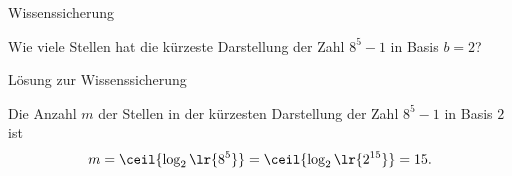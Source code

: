 \begin{frame}{Wissenssicherung}
	\begin{myexercise}\label{myexercise:003}
		Wie viele Stellen hat die kürzeste Darstellung der Zahl $8^5 - 1$ in Basis $b = 2$?
	\end{myexercise}
\end{frame}

\begin{frame}{Lösung zur Wissenssicherung}
	\begin{myanswer}
		Die Anzahl $m$ der Stellen in der kürzesten Darstellung der Zahl $8^5 - 1$ in Basis $2$ ist
		\begin{align*}
			m = \ceil{\log_{2}\lr{8^5}} = \ceil{\log_2\lr{2^{15}}} = 15.
		\end{align*}
	\end{myanswer}
\end{frame}


